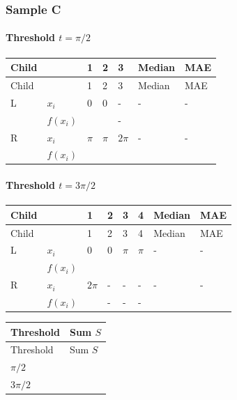 \documentclass[10pt]{article}
\begin{document}
\subsubsection*{Sample C}
\paragraph*{Threshold $t=\pi/2$}
\begingroup
\small
\setlength{\tabcolsep}{4pt}
\begin{longtable}{l|l|l|l|l|l|l}
Child &  & 1 & 2 & 3 & Median & MAE \\
\hline
\endfirsthead
Child &  & 1 & 2 & 3 & Median & MAE \\
\hline
\endhead
L & $x_i$ & $0$ & $0$ & - & - & - \\[3pt]
 & $f(x_i)$ & $\phantom{0}$ & $\phantom{0}$ & - & $\phantom{0}$ & $\phantom{0}$ \\[3pt]
R & $x_i$ & $\pi$ & $\pi$ & $2\pi$ & - & - \\[3pt]
 & $f(x_i)$ & $\phantom{0}$ & $\phantom{0}$ & $\phantom{0}$ & $\phantom{0}$ & $\phantom{0}$ \\[3pt]
\end{longtable}
\endgroup
\paragraph*{Threshold $t=3\pi/2$}
\begingroup
\small
\setlength{\tabcolsep}{4pt}
\begin{longtable}{l|l|l|l|l|l|l|l}
Child &  & 1 & 2 & 3 & 4 & Median & MAE \\
\hline
\endfirsthead
Child &  & 1 & 2 & 3 & 4 & Median & MAE \\
\hline
\endhead
L & $x_i$ & $0$ & $0$ & $\pi$ & $\pi$ & - & - \\[3pt]
 & $f(x_i)$ & $\phantom{0}$ & $\phantom{0}$ & $\phantom{0}$ & $\phantom{0}$ & $\phantom{0}$ & $\phantom{0}$ \\[3pt]
R & $x_i$ & $2\pi$ & - & - & - & - & - \\[3pt]
 & $f(x_i)$ & $\phantom{0}$ & - & - & - & $\phantom{0}$ & $\phantom{0}$ \\[3pt]
\end{longtable}
\endgroup
\begingroup
\small
\setlength{\tabcolsep}{4pt}
\begin{longtable}{l|l}
Threshold & Sum $S$ \\
\hline
\endfirsthead
Threshold & Sum $S$ \\
\hline
\endhead
$\pi/2$ & $\phantom{0}$ \\[3pt]
$3\pi/2$ & $\phantom{0}$ \\[3pt]
\end{longtable}
\endgroup
\begingroup\color{red}
\end{document}
